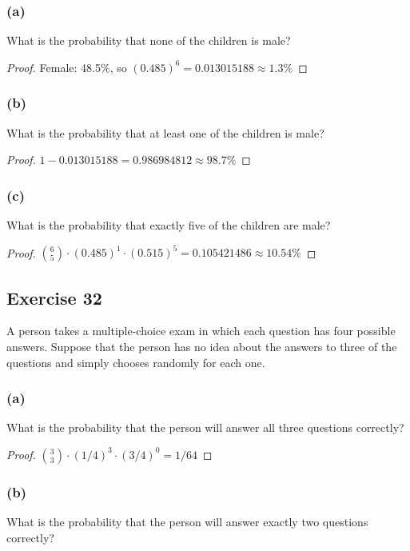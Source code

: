 \documentclass[14pt]{extarticle}
\begin{document}
\subsubsection{(a)}
What is the probability that none of the children is male?

\begin{proof}
     Female: 48.5\%, so \((0.485)^6 = 0.013015188 \approx 1.3\%\)
\end{proof}

\subsubsection{(b)}
What is the probability that at least one of the children is male?

\begin{proof}
     \(1 - 0.013015188 = 0.986984812 \approx 98.7\%\)
\end{proof}

\subsubsection{(c)}
What is the probability that exactly five of the children are male?

\begin{proof}
     \(\binom{6}{5} \cdot (0.485)^1 \cdot (0.515)^5 = 0.105421486 \approx 10.54\%\)
\end{proof}

\subsection{Exercise 32}
A person takes a multiple-choice exam in which each question has four possible answers. Suppose that the person has no idea
about the answers to three of the questions and simply chooses randomly for each one.

\subsubsection{(a)}
What is the probability that the person will answer all three questions correctly?

\begin{proof}
     \(\binom{3}{3} \cdot (1/4)^3 \cdot (3/4)^0 = 1/64\)
\end{proof}

\subsubsection{(b)}
What is the probability that the person will answer exactly two questions correctly?
\end{document}

